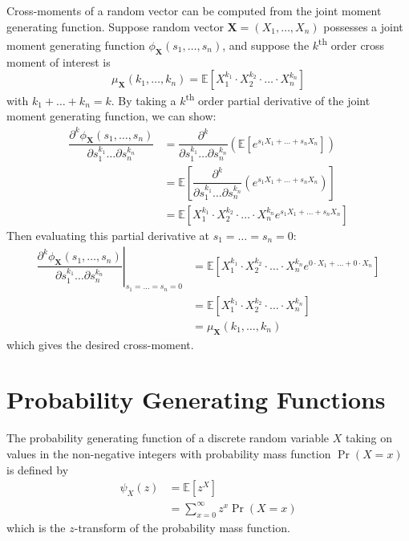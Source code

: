 \documentclass[11pt]{report} %
\begin{document}
Cross-moments of a random vector can be computed from the joint moment generating function. Suppose random vector $\mathbf{X} = \left(X_{1}, \dots, X_{n}\right)$ possesses a joint moment generating function $\phi_{\mathbf{X}}\left(s_{1}, \dots, s_{n}\right)$, and suppose the $k$\textsuperscript{th} order cross moment of interest is
\begin{equation}
\mu_{\mathbf{X}}\left(k_{1}, \dots, k_{n}\right) = \mathbb{E}\left[X_{1}^{k_{1}}\cdot X_{2}^{k_{2}}\cdot \dots \cdot X_{n}^{k_{n}}\right]
\end{equation}
with $k_{1} + \dots + k_{n} = k$. By taking a $k$\textsuperscript{th} order partial derivative of the joint moment generating function, we can show:
\begin{align}
\dfrac{\partial^{k}\phi_{\mathbf{X}}\left(s_{1}, \dots, s_{n}\right)}{\partial s_{1}^{k_{1}}\dots\partial s_{n}^{k_{n}}} &= \dfrac{\partial^{k}}{\partial s_{1}^{k_{1}}\dots\partial s_{n}^{k_{n}}}\left(\mathbb{E}\left[e^{s_{1}X_{1} + \dots + s_{n}X_{n}}\right]\right) \\
&= \mathbb{E}\left[\dfrac{\partial^{k}}{\partial s_{1}^{k_{1}}\dots\partial s_{n}^{k_{n}}}\left(e^{s_{1}X_{1} + \dots + s_{n}X_{n}}\right)\right] \\
&= \mathbb{E}\left[X_{1}^{k_{1}}\cdot X_{2}^{k_{2}}\cdot \dots \cdot X_{n}^{k_{n}}e^{s_{1}X_{1} + \dots + s_{n}X_{n}}\right] 
\end{align}
Then evaluating this partial derivative at $s_{1} = \dots = s_{n} = 0$:
\begin{align}
\left.\dfrac{\partial^{k}\phi_{\mathbf{X}}\left(s_{1}, \dots, s_{n}\right)}{\partial s_{1}^{k_{1}}\dots\partial s_{n}^{k_{n}}}\right|_{s_{1} = \dots = s_{n} = 0} &= \mathbb{E}\left[X_{1}^{k_{1}}\cdot X_{2}^{k_{2}}\cdot \dots \cdot X_{n}^{k_{n}}e^{0\cdot X_{1} + \dots + 0\cdot X_{n}}\right] \\
&= \mathbb{E}\left[X_{1}^{k_{1}}\cdot X_{2}^{k_{2}}\cdot \dots \cdot X_{n}^{k_{n}}\right] \\
&= \mu_{\mathbf{X}}\left(k_{1}, \dots, k_{n}\right)
\end{align}
which gives the desired cross-moment.

\section{Probability Generating Functions}

The probability generating function of a discrete random variable $X$ taking on values in the non-negative integers with probability mass function $\operatorname{Pr}\left(X = x\right)$ is defined by
\begin{align}
\psi_{X}\left(z\right) &= \mathbb{E}\left[z^{X}\right] \\
&= \sum_{x = 0}^{\infty}z^{x}\operatorname{Pr}\left(X = x\right)
\end{align}
which is the $z$-transform of the probability mass function.
\end{document}
